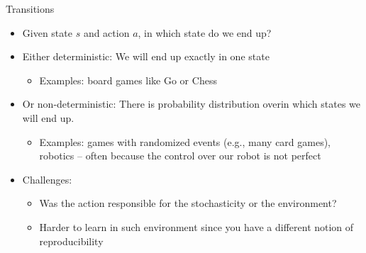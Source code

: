 \begin{frame}[c]{Transitions}
	
	\begin{itemize}
		\item Given state $s$ and action $a$, in which state do we end up?
		\smallskip
		\pause
		\item Either deterministic: We will end up exactly in one state
		\begin{itemize}
			\item Examples: board games like Go or Chess
		\end{itemize}
		\pause
		\item Or non-deterministic: There is probability distribution over\newline in which states we will end up.
		\begin{itemize}
			\item Examples: games with randomized events (e.g., many card games), robotics -- often because the control over our robot is not perfect
		\end{itemize}
		\item Challenges:
		\begin{itemize}
			\item Was the action responsible for the stochasticity or the environment?
			\item Harder to learn in such environment since you have a different notion of reproducibility
		\end{itemize}
	\end{itemize}
	
\end{frame}

